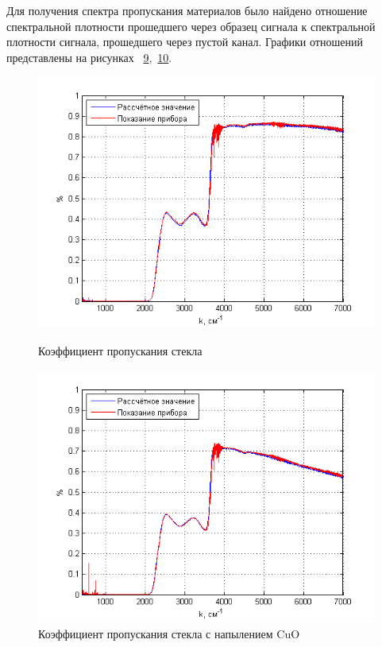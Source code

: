 \documentclass[a4paper,12pt]{article} %
\begin{document}
    Для получения спектра пропускания материалов было найдено отношение спектральной плотности прошедшего через образец сигнала 
    к спектральной плотности сигнала, прошедшего через пустой канал. Графики отношений представлены на рисунках 
    \hyperref[picture_9]{9}, \hyperref[picture_10]{10}.

    \newpage

    \begin{figure}[h!]
        \begin{center}
            \begin{minipage}[h!]{0.4\linewidth}
                \includegraphics[width=1.2\linewidth]{9.png}
                \caption{Коэффициент пропускания стекла}
                \label{picture_9}
            \end{minipage}
            \hfill
            \begin{minipage}[h!]{0.4\linewidth}
                \includegraphics[width=1.2\linewidth]{10.png}
                \caption{Коэффициент пропускания стекла с напылением CuO}
                \label{picture_10}
            \end{minipage}
        \end{center}
    \end{figure}
\end{document}

